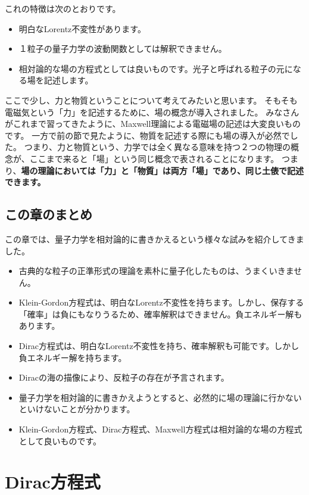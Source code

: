 \documentclass[report,paper=a4, fontsize=12pt, line_length=16cm, number_of_lines=33,dvipdfmx]{jlreq}
\numberwithin{equation}{chapter}
\newcommand{\strong}[1]{{\sffamily \bfseries #1}}
\begin{document}
これの特徴は次のとおりです。
\begin{itemize}
  \item 明白なLorentz不変性があります。
  \item １粒子の量子力学の波動関数としては解釈できません。
  \item 相対論的な場の方程式としては良いものです。光子と呼ばれる粒子の元になる場を記述します。
\end{itemize}

ここで少し、力と物質ということについて考えてみたいと思います。
そもそも電磁気という「力」を記述するために、場の概念が導入されました。
みなさんがこれまで習ってきたように、Maxwell理論による電磁場の記述は大変良いものです。
一方で前の節で見たように、物質を記述する際にも場の導入が必然でした。
つまり、力と物質という、力学では全く異なる意味を持つ２つの物理の概念が、ここまで来ると「場」という同じ概念で表されることになります。
つまり、\strong{場の理論においては「力」と「物質」は両方「場」であり、同じ土俵で記述できます。}


\section{この章のまとめ}
この章では、量子力学を相対論的に書きかえるという様々な試みを紹介してきました。
\begin{itemize}
  \item 古典的な粒子の正準形式の理論を素朴に量子化したものは、うまくいきません。
  \item Klein-Gordon方程式は、明白なLorentz不変性を持ちます。しかし、保存する「確率」は負にもなりうるため、確率解釈はできません。負エネルギー解もあります。
  \item Dirac方程式は、明白なLorentz不変性を持ち、確率解釈も可能です。しかし負エネルギー解を持ちます。
  \item Diracの海の描像により、反粒子の存在が予言されます。
  \item 量子力学を相対論的に書きかえようとすると、必然的に場の理論に行かないといけないことが分かります。
  \item Klein-Gordon方程式、Dirac方程式、Maxwell方程式は相対論的な場の方程式として良いものです。
\end{itemize}

\chapter{Dirac方程式}
\end{document}

